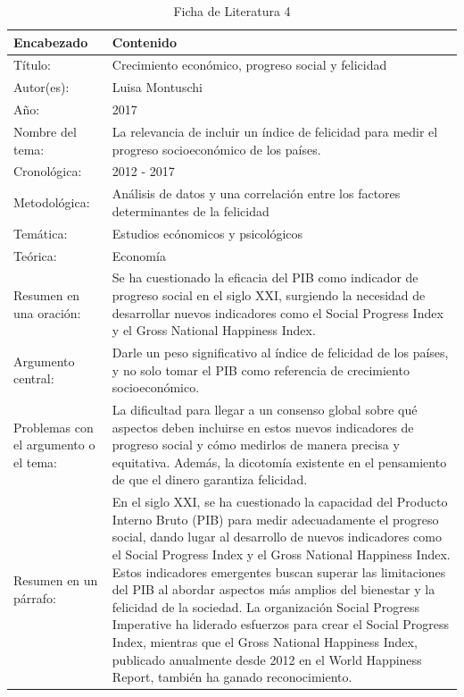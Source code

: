 \documentclass[12pt,oneside,letterpaper,spanish]{article}
\begin{document}
\newpage
\begin{table}[H]
    \caption{Ficha de Literatura 4}
    \begin{center}
        \begin{tabular}{  m{3cm} | m{12cm}  }
        \hline\textbf{ Encabezado} & \textbf{Contenido }\\ \hline
        Título: &  Crecimiento económico, progreso social y felicidad\\ \hline
        Autor(es): & Luisa Montuschi  \\ \hline
        Año: &  2017\\ \hline
        Nombre del tema: &  La relevancia de incluir un índice de felicidad para medir el progreso socioeconómico de los países. \\ \hline
        Cronológica: &  2012 - 2017\\ \hline
        Metodológica: &  Análisis de datos y una correlación entre los factores determinantes de la felicidad \\ \hline
        Temática: & Estudios ecónomicos y psicológicos \\ \hline
        Teórica:  & Economía \\ \hline
        Resumen en una oración: &  Se ha cuestionado la eficacia del PIB como indicador de progreso social en el siglo XXI, surgiendo la necesidad de desarrollar nuevos indicadores como el Social Progress Index y el Gross National Happiness Index.\\ \hline
        Argumento central: &  Darle un peso significativo al índice de felicidad de los países, y no solo tomar el PIB como referencia de crecimiento socioeconómico.\\ \hline
        Problemas con el argumento o el tema: &  La dificultad para llegar a un consenso global sobre qué aspectos deben incluirse en estos nuevos indicadores de progreso social y cómo medirlos de manera precisa y equitativa. Además, la dicotomía existente en el pensamiento de que el dinero garantiza felicidad.\\ \hline
        Resumen en un párrafo: & En el siglo XXI, se ha cuestionado la capacidad del Producto Interno Bruto (PIB) para medir adecuadamente el progreso social, dando lugar al desarrollo de nuevos indicadores como el Social Progress Index y el Gross National Happiness Index. Estos indicadores emergentes buscan superar las limitaciones del PIB al abordar aspectos más amplios del bienestar y la felicidad de la sociedad. La organización Social Progress Imperative ha liderado esfuerzos para crear el Social Progress Index, mientras que el Gross National Happiness Index, publicado anualmente desde 2012 en el World Happiness Report, también ha ganado reconocimiento. \\ \hline
        \end{tabular}
    \end{center}
\end{table}
\end{document}
